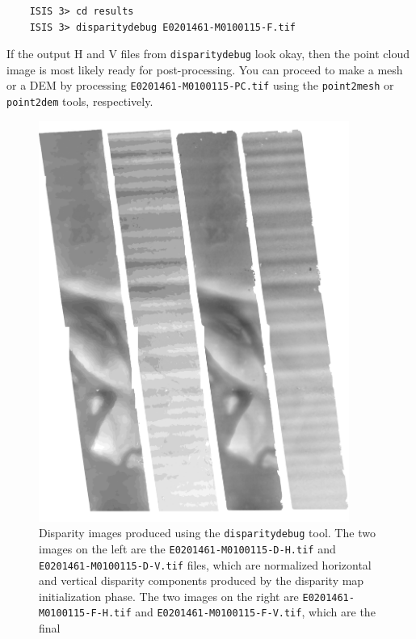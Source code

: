 \begin{verbatim}
    ISIS 3> cd results
    ISIS 3> disparitydebug E0201461-M0100115-F.tif
\end{verbatim}

If the output H and V files from \texttt{disparitydebug} look okay,
then the point cloud image is most likely ready for post-processing.
You can proceed to make a mesh or a \ac{DEM} by processing
\texttt{E0201461-M0100115-PC.tif} using the \texttt{point2mesh} or
\texttt{point2dem} tools, respectively.

\begin{figure}[b!]
\begin{minipage}{4in}
\includegraphics[width=4in]{images/p19-disparity.png}
\end{minipage}
\hfill
\begin{minipage}{2.7in}
\caption[P19 disparity images]{
    \label{p19-disparity}
	Disparity images produced using the \texttt{disparitydebug}
        tool.  The two images on the left are the
        \texttt{E0201461-M0100115-D-H.tif} and
        \texttt{E0201461-M0100115-D-V.tif} files, which are normalized
        horizontal and vertical disparity components produced by the
        disparity map initialization phase.  The two images on the
        right are \texttt{E0201461-M0100115-F-H.tif} and
        \texttt{E0201461-M0100115-F-V.tif}, which are the final
}
\end{minipage}
\end{figure}

